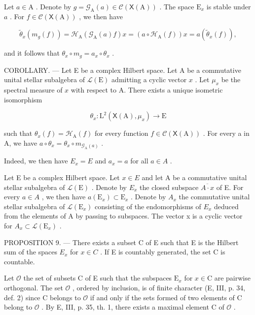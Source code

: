 Let \(a \in \mathrm{A}\) . Denote by \(g = \mathcal{G}_{\mathrm{A}}(a) \in \mathcal{C}(\mathsf{X}(\mathrm{A}))\) . The space \(\mathrm{E}_x\) is stable under \(a\) . For \(f \in \mathcal{C}(\mathsf{X}(\mathrm{A}))\) , we then have

\[
\widetilde {\theta} _ {x} (m _ {g} (f)) = \mathcal {H} _ {\mathrm{A}} (\mathcal {G} _ {\mathrm{A}} (a) f) x = (a \circ \mathcal {H} _ {\mathrm{A}} (f)) x = a (\widetilde {\theta} _ {x} (f)),
\]

and it follows that \(\theta_x \circ m_g = a_x \circ \theta_x\) .

COROLLARY. — Let E be a complex Hilbert space. Let A be a commutative unital stellar subalgebra of \(\mathcal{L}(\mathrm{E})\) admitting a cyclic vector \(x\) . Let \(\mu_x\) be the spectral measure of \(x\) with respect to A. There exists a unique isometric isomorphism

\[
\theta_ {x} \colon \mathrm{L} ^ {2} (\mathsf {X} (\mathrm{A}), \mu_ {x}) \to \mathrm{E}
\]

such that \(\theta_x(f) = \mathcal{H}_{\mathrm{A}}(f)\) for every function \(f \in \mathcal{C}(\mathsf{X}(\mathrm{A}))\) . For every a in A, we have \(a \circ \theta_x = \theta_x \circ m_{\mathcal{G}_{\mathrm{A}}(a)}\) .

Indeed, we then have \(E_{x}=E\) and \(a_{x}=a\) for all \(a\in A\) .

Let E be a complex Hilbert space. Let \(x \in E\) and let A be a commutative unital stellar subalgebra of \(\mathcal{L}(\mathrm{E})\) . Denote by \(E_{x}\) the closed subspace \(\overline{A \cdot x}\) of E. For every \(a \in A\) , we then have \(a(\mathrm{E}_{x}) \subset \mathrm{E}_{x}\) . Denote by \(A_{x}\) the commutative unital stellar subalgebra of \(\mathcal{L}(\mathrm{E}_{x})\) consisting of the endomorphisms of \(E_{x}\) deduced from the elements of A by passing to subspaces. The vector x is a cyclic vector for \(A_{x} \subset \mathcal{L}(\mathrm{E}_{x})\) .

PROPOSITION 9. --- There exists a subset C of E such that E is the Hilbert sum of the spaces \(E_{x}\) for \(x \in C\) . If E is countably generated, the set C is countable.

Let \(\mathcal{O}\) the set of subsets C of E such that the subspaces \(\mathrm{E}_x\) for \(x\in \mathrm{C}\) are pairwise orthogonal. The set \(\mathcal{O}\) , ordered by inclusion, is of finite character (E, III, p. 34, def. 2) since C belongs to \(\mathcal{O}\) if and only if the sets formed of two elements of C belong to \(\mathcal{O}\) . By E, III, p. 35, th. 1, there exists a maximal element C of \(\mathcal{O}\) .

